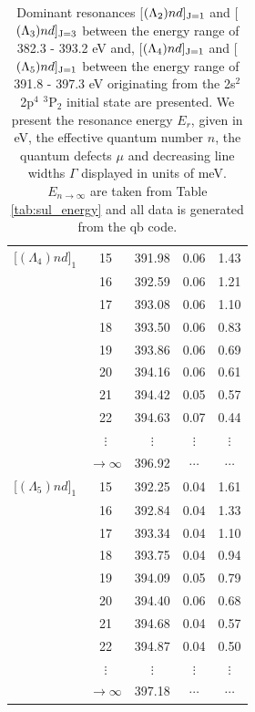 \begin{table}[hbt]
\begin{center}
\begin{tabular}{@{} l c c c c @{}}
  \multicolumn{1}{c}{[$(\Lambda_4)nd]_{1}$} & 15 & 391.98 & 0.06 & 1.43  \\
  \multicolumn{1}{c}{} & 16 & 392.59 & 0.06 & 1.21  \\
  \multicolumn{1}{c}{} & 17 & 393.08 & 0.06 & 1.10  \\
  \multicolumn{1}{c}{} & 18 & 393.50 & 0.06 & 0.83  \\
  \multicolumn{1}{c}{} & 19 & 393.86 & 0.06 & 0.69  \\
  \multicolumn{1}{c}{} & 20 & 394.16 & 0.06 & 0.61  \\
  \multicolumn{1}{c}{} & 21 & 394.42 & 0.05 & 0.57  \\
  \multicolumn{1}{c}{} & 22 & 394.63 & 0.07 & 0.44 \\
  \multicolumn{1}{c}{} & $\vdots$ & $\vdots$ & $\vdots$ & $\vdots$  \\
  \multicolumn{1}{c}{} & $\rightarrow \infty$ & 396.92 & $\cdots$ & $\cdots$   \\
                    \midrule
   \multicolumn{1}{c}{[$(\Lambda_5)nd]_{1}$} & 15 & 392.25 & 0.04 & 1.61 \\
  \multicolumn{1}{c}{}   & 16 & 392.84 & 0.04 & 1.33 \\
  \multicolumn{1}{c}{}   & 17 & 393.34 & 0.04 & 1.10 \\
  \multicolumn{1}{c}{}  & 18 & 393.75 & 0.04 & 0.94 \\
  \multicolumn{1}{c}{}  & 19 & 394.09 & 0.05 & 0.79 \\
  \multicolumn{1}{c}{}  & 20 & 394.40 & 0.06 & 0.68 \\
  \multicolumn{1}{c}{} & 21 & 394.68 & 0.04 & 0.57 \\
  \multicolumn{1}{c}{}   & 22 & 394.87 & 0.04 & 0.50  \\
  \multicolumn{1}{c}{}   & $\vdots$ & $\vdots$ & $\vdots$ & $\vdots$ \\
  \multicolumn{1}{c}{}  & $\rightarrow \infty$ & 397.18 & $\cdots$ & $\cdots$ \\
           
  
                    
                                                   \bottomrule
 \end{tabular}
 \caption{Dominant resonances [$(\Lambda_2)nd]_{{\rm J=1}}$ and [$(\Lambda_3)nd]_{{\rm J=3}}$ between the energy range of 382.3 - 393.2 eV and, [$(\Lambda_4)nd]_{{\rm J=1}}$ and [$(\Lambda_5)nd]_{{\rm J=1}}$ between the energy range of 391.8 - 397.3 eV originating from the 2s$^2$2p$^4$ $^3$P$_2$ initial state are presented. We present the resonance energy $E_r$, given in eV, the effective quantum number $n$, the quantum defects $\mu$ and decreasing line widths $\Gamma$ displayed in units of meV. $E_{n\rightarrow \infty}$ are taken from Table \ref{tab:sul_energy} and all data is generated from the {\sc qb} code. \label{tab:sul_res1}}
 \end{center}
\end{table}


